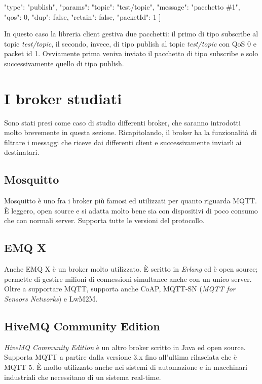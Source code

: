 \documentclass[binding=0.6cm,TFA]{sapthesis}
\begin{document}
\begin{large}
\begin{python}
    {
        "type": "publish",
        "params": {
            "topic": "test/topic",
            "message": "pacchetto \#1",
            "qos": 0,
            "dup": false,
            "retain": false,
            "packetId": 1
        }
    }
]
\end{python}
In questo caso la libreria client gestiva due pacchetti: il primo di tipo subscribe al topic \textit{test/topic}, il secondo, invece, di tipo publish al topic \textit{test/topic} con QoS 0 e packet id 1. Ovviamente prima veniva inviato il pacchetto di tipo subscribe e solo successivamente quello di tipo publish.

\section{I broker studiati}
Sono stati presi come caso di studio differenti broker, che saranno introdotti molto brevemente in questa sezione. Ricapitolando, il broker ha la funzionalità di filtrare i messaggi che riceve dai differenti client e successivamente inviarli ai destinatari.

\subsection{Mosquitto}
Mosquitto \cite{Light2017} è uno fra i broker più famosi ed utilizzati per quanto riguarda MQTT. È leggero, open source e si adatta molto bene sia con dispositivi di poco consumo che con normali server. Supporta tutte le versioni del protocollo.

\subsection{EMQ X}
Anche EMQ X è un broker molto utilizzato. È scritto in \textit{Erlang} ed è open source; permette di gestire milioni di connessioni simultanee anche con un unico server. Oltre a supportare MQTT, supporta anche CoAP, MQTT-SN (\textit{MQTT for Sensors Networks}) e LwM2M.

\subsection{HiveMQ Community Edition}
\textit{HiveMQ Community Edition} è un altro broker scritto in Java ed open source.
Supporta MQTT a partire dalla versione 3.x fino all'ultima rilasciata che è MQTT 5. È molto utilizzato anche nei sistemi di automazione e in macchinari industriali che necessitano di un sistema real-time.


\end{large}
\end{document}

